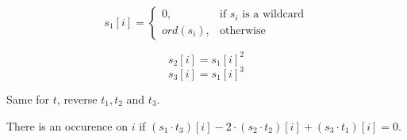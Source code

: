 $$s_1[i] = \begin{cases} 0, & \mbox{if } s_i\mbox{ is a wildcard} \\ ord(s_i), & \mbox{otherwise } \end{cases}$$

$$s_2[i] = s_1[i]^2$$
$$s_3[i] = s_1[i]^3$$

Same for $t$, reverse $t_1, t_2$ and $t_3$.

There is an occurence on $i$ if $(s_1 \cdot t_3)[i] - 2 \cdot (s_2 \cdot t_2)[i] + (s_3 \cdot t_1)[i] = 0$.